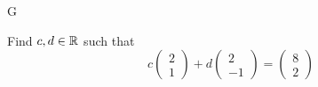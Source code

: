
G%

\begin{exercise}
    Find $c, d \in \mathbb{R}$ such that
    \[
        c \begin{pmatrix} 2 \\ 1 \end{pmatrix} + d \begin{pmatrix} 2 \\ -1 \end{pmatrix} = \begin{pmatrix} 8 \\ 2 \end{pmatrix}
    \]
\end{exercise}

